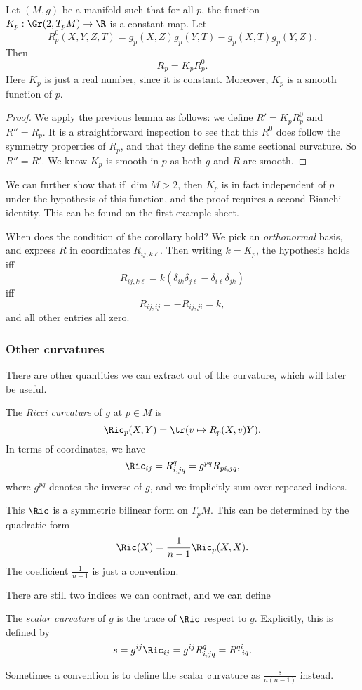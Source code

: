 \documentclass[a4paper]{article}
\begin{document}
\begin{cor}
  Let $(M, g)$ be a manifold such that for all $p$, the function $K_p: \Gr(2, T_p M) \to \R$ is a constant map. Let
  \[
    R^0_p (X, Y, Z, T) = g_p(X, Z) g_p(Y, T) - g_p(X, T) g_p(Y, Z).
  \]
  Then
  \[
    R_p= K_p R_p^0.
  \]
  Here $K_p$ is just a real number, since it is constant. Moreover, $K_p$ is a smooth function of $p$.
\end{cor}

\begin{proof}
  We apply the previous lemma as follows: we define $R' = K_p R_p^0$ and $R'' = R_p$. It is a straightforward inspection to see that this $R^0$ does follow the symmetry properties of $R_p$, and that they define the same sectional curvature. So $R'' = R'$. We know $K_p$ is smooth in $p$ as both $g$ and $R$ are smooth.
\end{proof}
We can further show that if $\dim M > 2$, then $K_p$ is in fact independent of $p$ under the hypothesis of this function, and the proof requires a second Bianchi identity. This can be found on the first example sheet.

When does the condition of the corollary hold? We pick an \emph{orthonormal} basis, and express $R$ in coordinates $R_{ij, k\ell}$. Then writing $k = K_p$, the hypothesis holds iff
\[
  R_{ij, k\ell} = k(\delta_{ik}\delta_{j\ell} - \delta_{i\ell} \delta_{jk})
\]
iff
\[
  R_{ij, ij} = - R_{ij, ji} = k,
\]
and all other entries all zero.

\subsubsection*{Other curvatures}
There are other quantities we can extract out of the curvature, which will later be useful.
\begin{defi}
  The \emph{Ricci curvature} of $g$ at $p \in M$ is
  \[
    \Ric_p(X, Y) = \tr(v \mapsto R_p(X, v) Y).
  \]
  In terms of coordinates, we have
  \[
    \Ric_{ij} = R^q_{i,jq} = g^{pq} R_{pi, jq},
  \]
  where $g^{pq}$ denotes the inverse of $g$, and we implicitly sum over repeated indices.

  This $\Ric$ is a symmetric bilinear form on $T_p M$. This can be determined by the quadratic form
  \[
    \Ric(X) = \frac{1}{n - 1} \Ric_p(X, X).
  \]
  The coefficient $\frac{1}{n - 1}$ is just a convention.
\end{defi}
There are still two indices we can contract, and we can define
\begin{defi}
  The \emph{scalar curvature} of $g$ is the trace of $\Ric$ respect to $g$. Explicitly, this is defined by
  \[
    s = g^{ij}\Ric_{ij} = g^{ij} R^q_{i, jq} = R^{qi}\!_{iq}.
  \]
\end{defi}
Sometimes a convention is to define the scalar curvature as $\frac{s}{n(n - 1)}$ instead.
\end{document}
